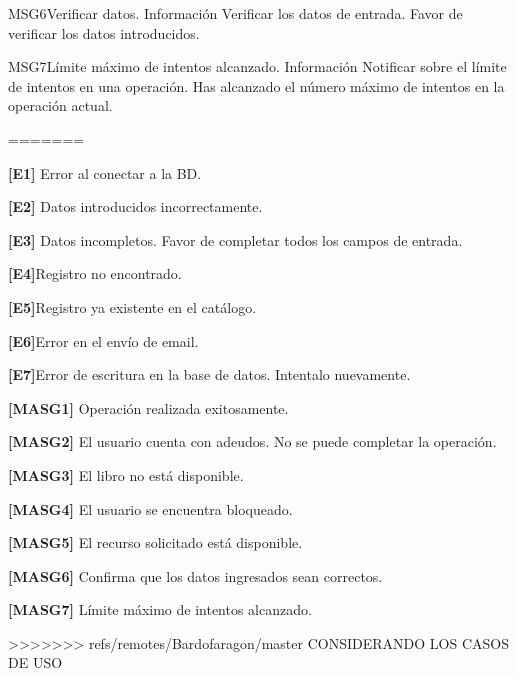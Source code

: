 \begin{Citemize}
		\item
		\begin{Message}{MSG6}{Verificar datos.}
			\MSGitem[Tipo: ] Información
			\MSGitem[Objetivo: ] Verificar los datos de entrada.
			\MSGitem[Redacción: ] Favor de verificar los datos introducidos.
		\end{Message}
	
		\item
		\begin{Message}{MSG7}{Límite máximo de intentos alcanzado.}
			\MSGitem[Tipo: ] Información
			\MSGitem[Objetivo: ] Notificar sobre el límite de intentos en una operación.
			\MSGitem[Redacción: ] Has alcanzado el número máximo de intentos en la operación actual.
		\end{Message}
		
=======
	\item {\bf [E1]} Error al conectar a la BD.
	\item {\bf [E2]} Datos introducidos incorrectamente. 
	\item {\bf [E3]} Datos incompletos. Favor de completar todos los campos de entrada.
	\item {\bf [E4]}Registro no encontrado.
	\item {\bf [E5]}Registro ya existente en el catálogo.
	\item {\bf [E6]}Error en el envío de email.
	\item {\bf [E7]}Error de escritura en la base de datos. Intentalo nuevamente.

	\item {\bf [MASG1]} Operación realizada exitosamente.
	\item {\bf [MASG2]} El usuario cuenta con adeudos. No se puede completar la operación.
	\item {\bf [MASG3]} El libro no está disponible.
	\item {\bf [MASG4]} El usuario se encuentra bloqueado.
	\item {\bf [MASG5]} El recurso solicitado está disponible.
	\item {\bf [MASG6]} Confirma que los datos ingresados sean correctos.
	\item {\bf [MASG7]} Límite máximo de intentos alcanzado.

>>>>>>> refs/remotes/Bardofaragon/master
CONSIDERANDO LOS CASOS DE USO


\end{Citemize}
